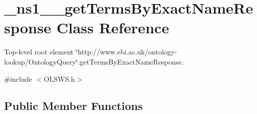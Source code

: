 \hypertarget{class__ns1____getTermsByExactNameResponse}{
\section{\_\-ns1\_\-\_\-getTermsByExactNameResponse Class Reference}
\label{class__ns1____getTermsByExactNameResponse}
}


Top-\/level root element \char`\"{}http://www.ebi.ac.uk/ontology-\/lookup/OntologyQuery\char`\"{}:getTermsByExactNameResponse.  




{\ttfamily \#include $<$OLSWS.h$>$}

\subsection*{Public Member Functions}
